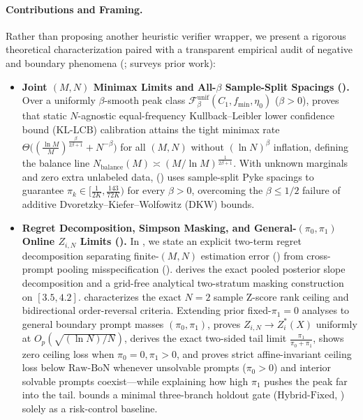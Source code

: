 \documentclass[10pt]{article}
\theoremstyle{plain}
\theoremstyle{definition}
\theoremstyle{remark}
\begin{document}
\paragraph{Contributions and Framing.}
Rather than proposing another heuristic verifier wrapper, we present a rigorous theoretical characterization paired with a transparent empirical audit of negative and boundary phenomena (;  surveys prior work):
\begin{itemize}[leftmargin=1.4em,itemsep=1pt,topsep=1pt]
    \item \textbf{Joint $(M,N)$ Minimax Limits and All-$\beta$ Sample-Split Spacings ().} Over a uniformly $\beta$-smooth peak class $\mathcal{F}_\beta^{\mathrm{unif}}(C_1, f_{\min}, \eta_0)$ ($\beta > 0$),  proves that static $N$-agnostic equal-frequency Kullback--Leibler lower confidence bound ($\mathrm{KL\text{-}LCB}$) calibration attains the tight minimax rate $\Theta\big((\frac{\ln M}{M})^{\frac{\beta}{2\beta+1}} + N^{-\beta}\big)$ for all $(M,N)$ without $(\ln N)^\beta$ inflation, defining the balance line $N_{\mathrm{balance}}(M) \asymp (M/\ln M)^{\frac{1}{2\beta+1}}$. With unknown marginals and zero extra unlabeled data,  () uses sample-split Pyke spacings to guarantee $\hat{\pi}_k \in [\frac{1}{2K}, \frac{143}{72K})$ for every $\beta > 0$, overcoming the $\beta \le 1/2$ failure of additive Dvoretzky--Kiefer--Wolfowitz ($\mathrm{DKW}$) bounds.
    \item \textbf{Regret Decomposition, Simpson Masking, and General-$(\pi_0, \pi_1)$ Online $Z_{i,N}$ Limits ().} In , we state an explicit two-term regret decomposition separating finite-$(M,N)$ estimation error () from cross-prompt pooling misspecification ().  derives the exact pooled posterior slope decomposition and a grid-free analytical two-stratum masking construction on $[3.5, 4.2]$.  characterizes the exact $N=2$ sample Z-score rank ceiling and bidirectional order-reversal criteria. Extending prior fixed-$\pi_1 = 0$ analyses to general boundary prompt masses $(\pi_0, \pi_1)$,  proves $Z_{i,N} \to Z_i^*(X)$ uniformly at $O_p(\sqrt{(\ln N)/N})$, derives the exact two-sided tail limit $\frac{\pi_1}{\pi_0 + \pi_1}$, shows zero ceiling loss when $\pi_0 = 0, \pi_1 > 0$, and proves strict affine-invariant ceiling loss below $\mathrm{Raw\text{-}BoN}$ whenever unsolvable prompts ($\pi_0 > 0$) and interior solvable prompts coexist---while explaining how high $\pi_1$ pushes the peak far into the tail.  bounds a minimal three-branch holdout gate ($\mathrm{Hybrid\text{-}Fixed}$, ) solely as a risk-control baseline.

\end{itemize}
\end{document}
